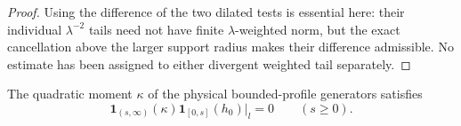 \begin{proof}
Using the difference of the two dilated tests is essential here:
their individual $\lambda^{-2}$ tails need not have finite
$\lambda$-weighted norm, but the exact cancellation above the larger
support radius makes their difference admissible.  No estimate has
been assigned to either divergent weighted tail separately.
\end{proof}

\begin{proposition}
\label{D:critical-comparison}
The quadratic moment $\kappa$ of the physical bounded-profile
generators satisfies
\begin{equation}\label{D:order-zero}
 \mathbf1_{(s,\infty)}(\kappa)
 \mathbf1_{[0,s]}(h_0)\big|_l=0\qquad(s\geq0).
\end{equation}
\end{proposition}

